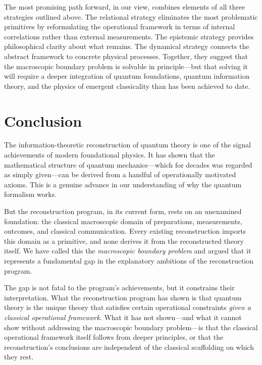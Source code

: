 \documentclass[12pt,a4paper,twoside]{article}
\begin{document}
The most promising path forward, in our view, combines elements of all three strategies outlined above. The relational strategy eliminates the most problematic primitives by reformulating the operational framework in terms of internal correlations rather than external measurements. The epistemic strategy provides philosophical clarity about what remains. The dynamical strategy connects the abstract framework to concrete physical processes. Together, they suggest that the macroscopic boundary problem is solvable in principle---but that solving it will require a deeper integration of quantum foundations, quantum information theory, and the physics of emergent classicality than has been achieved to date.

\section{Conclusion}

The information-theoretic reconstruction of quantum theory is one of the signal achievements of modern foundational physics. It has shown that the mathematical structure of quantum mechanics---which for decades was regarded as simply given---can be derived from a handful of operationally motivated axioms. This is a genuine advance in our understanding of why the quantum formalism works.

But the reconstruction program, in its current form, rests on an unexamined foundation: the classical macroscopic domain of preparations, measurements, outcomes, and classical communication. Every existing reconstruction imports this domain as a primitive, and none derives it from the reconstructed theory itself. We have called this the \emph{macroscopic boundary problem} and argued that it represents a fundamental gap in the explanatory ambitions of the reconstruction program.

The gap is not fatal to the program's achievements, but it constrains their interpretation. What the reconstruction program has shown is that quantum theory is the unique theory that satisfies certain operational constraints \emph{given a classical operational framework}. What it has not shown---and what it cannot show without addressing the macroscopic boundary problem---is that the classical operational framework itself follows from deeper principles, or that the reconstruction's conclusions are independent of the classical scaffolding on which they rest.
\end{document}
